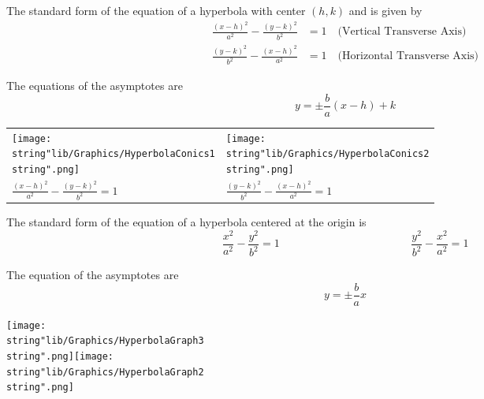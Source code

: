 \documentclass[11pt,a4paper]{book}
\begin{document}
\begin{tcolorbox}[colback=blue!5, colframe=black,boxrule=.4pt, sharpish corners]

The standard form of the equation of a hyperbola with center $\left(h,k\right)$
and is given by
\begin{align*}
\frac{\left(x-h\right)^{2}}{a^{2}}-\frac{\left(y-k\right)^{2}}{b^{2}} & =1\quad\text{(Vertical Transverse Axis)}\\
\frac{\left(y-k\right)^{2}}{b^{2}}-\frac{\left(x-h\right)^{2}}{a^{2}} & =1\quad\text{(Horizontal Transverse Axis)}
\end{align*}

The equations of the asymptotes are
\[
y=\pm\frac{b}{a}\left(x-h\right)+k
\]

\end{tcolorbox}

\begin{center}
\begin{tabular}{>{\centering}p{7cm}>{\centering}p{7cm}}
\centering{}\texttt{[image: \\string"lib/Graphics/HyperbolaConics1\\string".png]} & \centering{}\texttt{[image: \\string"lib/Graphics/HyperbolaConics2\\string".png]}\tabularnewline
${\displaystyle \frac{\left(x-h\right)^{2}}{a^{2}}-\frac{\left(y-k\right)^{2}}{b^{2}}=1}$ & ${\displaystyle \frac{\left(y-k\right)^{2}}{b^{2}}-\frac{\left(x-h\right)^{2}}{a^{2}}=1}$\tabularnewline
\end{tabular}
\par\end{center}

\newpage


\begin{tcolorbox}[colback=blue!5, colframe=black,boxrule=.4pt, sharpish corners]

The standard form of the equation of a hyperbola centered at the origin is
\[
\frac{x^{2}}{a^{2}}-\frac{y^{2}}{b^{2}}=1\hspace{5cm}\frac{y^{2}}{b^{2}}-\frac{x^{2}}{a^{2}}=1
\]

The equation of the asymptotes are
\[
y=\pm\frac{b}{a}x
\]

\end{tcolorbox}


\begin{center}
\texttt{[image: \\string"lib/Graphics/HyperbolaGraph3\\string".png]}\hspace{2cm}\texttt{[image: \\string"lib/Graphics/HyperbolaGraph2\\string".png]}
\par\end{center}
\end{document}
